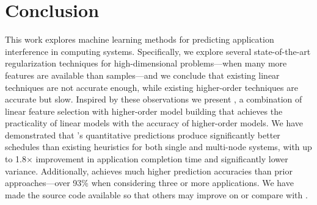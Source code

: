 \section{Conclusion}
This work explores machine learning methods for predicting
application interference in computing systems.  Specifically, we
explore several state-of-the-art regularization techniques for
high-dimensional problems---when many more features are available than
samples---and we conclude that existing linear techniques are not
accurate enough, while existing higher-order techniques are accurate
but slow.  Inspired by these observations we present \SYSTEMESP{}, a
combination of linear feature selection with higher-order model
building that achieves the practicality of linear models with the
accuracy of higher-order models.  We have demonstrated that
\SYSTEMESP{}'s quantitative predictions produce significantly better
schedules than existing heuristics for both single and multi-node
systems, with up to 1.8$\times$ improvement in application completion
time and significantly lower variance.  Additionally, \SYSTEMESP{}
achieves much higher prediction accuracies than prior
approaches---over 93\% when considering three or more applications.
We have made the source code available so that others may improve on
or compare with \SYSTEMESP{}.
